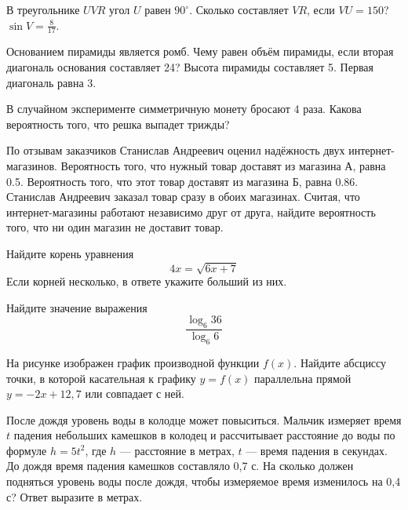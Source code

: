 
\begin{taskBN}{1}
В треугольнике $UVR$ угол $U$ равен $90^\circ$. Сколько составляет  $VR$, если $VU=150$? $\sin{V}=\frac{8}{17}$. 
\end{taskBN}

\begin{taskBN}{2}
Основанием пирамиды является ромб. Чему равен объём пирамиды, если вторая диагональ основания составляет 24? Высота пирамиды составляет 5. Первая диагональ равна 3. 
\end{taskBN}

\begin{taskBN}{3}
В случайном эксперименте симметричную монету бросают 4 раза. Какова вероятность того, что решка выпадет трижды?
\end{taskBN}

\begin{taskBN}{4}
По отзывам заказчиков Станислав Андреевич оценил надёжность двух интернет-магазинов. Вероятность того, что нужный товар доставят из магазина А, равна 0.5. Вероятность того, что этот товар доставят из магазина Б, равна 0.86. Станислав Андреевич заказал товар сразу в обоих магазинах. Считая, что интернет-магазины работают независимо друг от друга, найдите вероятность того, что ни один магазин не доставит товар.
\end{taskBN}

\begin{taskBN}{5}
Найдите корень уравнения $$4x=\sqrt{6x+7}$$ Если корней несколько, в ответе укажите больший из них.
\end{taskBN}

\begin{taskBN}{6}
Найдите значение выражения $$\frac{\log_{6}{36}}{\log_{6}{6}} $$
\end{taskBN}

\begin{taskBN}{7}
На рисунке изображен график производной функции $f(x)$. Найдите абсциссу точки, в которой касательная к графику $y=f(x)$ параллельна прямой $y=-2x+12{,}7$ или совпадает с ней.
\end{taskBN}

\begin{taskBN}{8}
После дождя уровень воды в колодце может повыситься. Мальчик измеряет время $t$ падения небольших камешков в колодец и рассчитывает расстояние до воды по формуле  $h=5t^2$, где $h$ — расстояние в метрах, $t$ — время падения в секундах. До дождя время падения камешков составляло 0,7 с. На сколько должен подняться уровень воды после дождя, чтобы измеряемое время изменилось на 0,4 с? Ответ выразите в метрах.
\end{taskBN}


